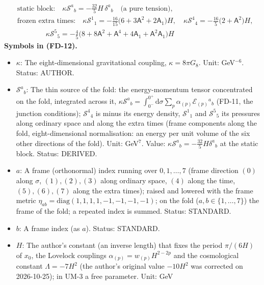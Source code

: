 \documentclass[
  10pt,
]{article}
\providecommand{\tightlist}{%
  \setlength{\itemsep}{0pt}\setlength{\parskip}{0pt}}
\begin{document}
\[
\begin{aligned}
&\text{static block:}\quad \kappa\mathcal{S}^a{}_b = -\frac{32}{5}H\,\delta^a{}_b\quad\text{(a pure tension)},\\
&\text{frozen extra times:}\quad \kappa\mathcal{S}^1{}_1 = -\frac{16}{15}\big(6 + 3\mathsf{A}^2 + 2\mathsf{A}_1\big)H,\quad
 \kappa\mathcal{S}^4{}_4 = -\frac{16}{5}\big(2 + \mathsf{A}^2\big)H,\\
&\qquad\qquad \kappa\mathcal{S}^5{}_5 = -\frac45\big(8 + 8\mathsf{A}^2 + \mathsf{A}^4 + 4\mathsf{A}_1 + \mathsf{A}^2\mathsf{A}_1\big)H
\end{aligned} \tag{FD-12}
\] \textbf{Symbols in (FD-12).}

\begin{itemize}
\tightlist
\item
  \(\kappa\): The eight-dimensional gravitational coupling,
  \(\kappa = 8\pi G_8\). Unit: GeV\(^{-6}\). Status: AUTHOR.
\item
  \(\mathcal{S}^a{}_b\): The thin source of the fold: the
  energy-momentum tensor concentrated on the fold, integrated across it,
  \(\kappa\mathcal{S}^a{}_b = \int_{0^-}^{0^+}\mathrm{d}\sigma\sum_p\alpha_{(p)}\mathcal{E}_{(p)}{}^a{}_b\)
  (FD-11, the junction conditions); \(\mathcal{S}^4{}_4\) is minus its
  energy density, \(\mathcal{S}^1{}_1\) and \(\mathcal{S}^5{}_5\) its
  pressures along ordinary space and along the extra times (frame
  components along the fold, eight-dimensional normalisation: an energy
  per unit volume of the six other directions of the fold). Unit:
  GeV\(^7\). Value:
  \(\kappa\mathcal{S}^a{}_b = -\frac{32}{5}H\delta^a{}_b\) at the static
  block. Status: DERIVED.
\item
  \(a\): A frame (orthonormal) index running over \(0, 1, \dots, 7\)
  (frame direction \((0)\) along \(\sigma\), \((1), (2), (3)\) along
  ordinary space, \((4)\) along the time, \((5), (6), (7)\) along the
  extra times); raised and lowered with the frame metric
  \(\eta_{ab} = \mathrm{diag}(1, 1, 1, 1, -1, -1, -1, -1)\); on the fold
  (\(a, b \in \{1, \dots, 7\}\)) the frame of the fold; a repeated index
  is summed. Status: STANDARD.
\item
  \(b\): A frame index (as \(a\)). Status: STANDARD.
\item
  \(H\): The author's constant (an inverse length) that fixes the period
  \(\pi/(6H)\) of \(x_0\), the Lovelock couplings
  \(\alpha_{(p)} = w_{(p)}H^{2-2p}\) and the cosmological constant
  \(\Lambda = -7H^2\) (the author's original value \(-10H^2\) was
  corrected on 2026-10-25); in UM-3 a free parameter. Unit: GeV

\end{itemize}
\end{document}
